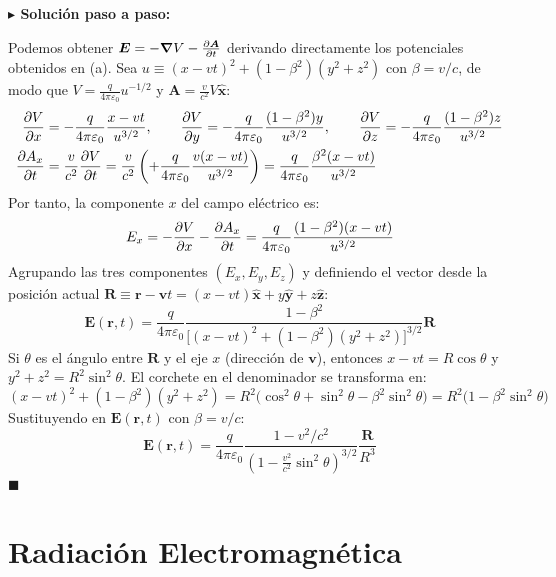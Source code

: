 \documentclass[11pt,a4paper]{book}
\newenvironment{solucion}{%
    \par\medskip\noindent\textbf{\color{blue!65!black}\Large $\blacktriangleright$ Solución paso a paso:}\par\medskip
}{%
    \hfill$\blacksquare$\par\bigskip
}
\newcommand{\xhat}{\hat{\bm{x}}}
\newcommand{\yhat}{\hat{\bm{y}}}
\newcommand{\zhat}{\hat{\bm{z}}}
\newcommand{\Evec}{\bm{E}}
\newcommand{\Avec}{\bm{A}}
\begin{document}
\begin{solucion}
Podemos obtener $\Evec = -\grad V - \pdv{\Avec}{t}$ derivando directamente los potenciales obtenidos en (a). Sea $u \equiv (x - vt)^2 + (1 - \beta^2)(y^2 + z^2)$ con $\beta = v/c$, de modo que $V = \frac{q}{4\pi\varepsilon_0} u^{-1/2}$ y $\Avec = \frac{v}{c^2}V\xhat$:
\begin{align}
    \pdv{V}{x} &= -\frac{q}{4\pi\varepsilon_0} \frac{x - vt}{u^{3/2}}, \qquad \pdv{V}{y} = -\frac{q}{4\pi\varepsilon_0} \frac{(1 - \beta^2)y}{u^{3/2}}, \qquad \pdv{V}{z} = -\frac{q}{4\pi\varepsilon_0} \frac{(1 - \beta^2)z}{u^{3/2}} \\
    \pdv{A_x}{t} &= \frac{v}{c^2}\pdv{V}{t} = \frac{v}{c^2}\left( +\frac{q}{4\pi\varepsilon_0}\frac{v(x - vt)}{u^{3/2}} \right) = \frac{q}{4\pi\varepsilon_0} \frac{\beta^2(x - vt)}{u^{3/2}}
\end{align}
Por tanto, la componente $x$ del campo eléctrico es:
\begin{equation}
    E_x = -\pdv{V}{x} - \pdv{A_x}{t} = \frac{q}{4\pi\varepsilon_0} \frac{(1 - \beta^2)(x - vt)}{u^{3/2}}
\end{equation}
Agrupando las tres componentes $(E_x, E_y, E_z)$ y definiendo el vector desde la posición actual $\bm{R} \equiv \bm{r} - \bm{v}t = (x - vt)\xhat + y\yhat + z\zhat$:
\begin{equation}
    \Evec(\bm{r},t) = \frac{q}{4\pi\varepsilon_0} \frac{1 - \beta^2}{\big[(x - vt)^2 + (1 - \beta^2)(y^2 + z^2)\big]^{3/2}} \bm{R}
\end{equation}
Si $\theta$ es el ángulo entre $\bm{R}$ y el eje $x$ (dirección de $\bm{v}$), entonces $x - vt = R\cos\theta$ y $y^2 + z^2 = R^2\sin^2\theta$. El corchete en el denominador se transforma en:
\begin{equation}
    (x - vt)^2 + (1 - \beta^2)(y^2 + z^2) = R^2\big(\cos^2\theta + \sin^2\theta - \beta^2\sin^2\theta\big) = R^2\big(1 - \beta^2\sin^2\theta\big)
\end{equation}
Sustituyendo en $\Evec(\bm{r},t)$ con $\beta = v/c$:
\begin{equation}
    \Evec(\bm{r},t) = \frac{q}{4\pi\varepsilon_0} \frac{1 - v^2/c^2}{\left(1 - \frac{v^2}{c^2}\sin^2\theta\right)^{3/2}} \frac{\bm{R}}{R^3}
\end{equation}
\end{solucion}

\chapter{Radiación Electromagnética}
\end{document}
